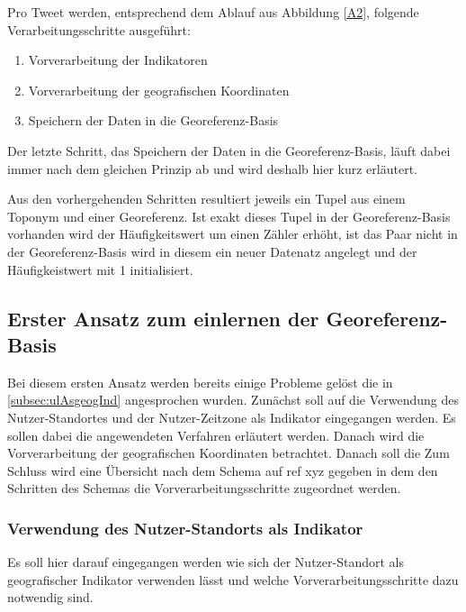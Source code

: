 					Pro Tweet werden, entsprechend dem Ablauf aus Abbildung \ref{A2}, folgende Verarbeitungsschritte ausgeführt:

					\begin{enumerate}
						\item Vorverarbeitung der Indikatoren
						\item Vorverarbeitung der geografischen Koordinaten
						\item Speichern der Daten in die Georeferenz-Basis
					\end{enumerate}

					Der letzte Schritt, das Speichern der Daten in die Georeferenz-Basis, läuft dabei immer nach dem gleichen Prinzip ab und wird deshalb hier kurz erläutert.
					
					Aus den vorhergehenden Schritten resultiert jeweils ein Tupel aus einem Toponym und einer Georeferenz. 
					Ist exakt dieses Tupel in der Georeferenz-Basis vorhanden wird der Häufigkeitswert um einen Zähler erhöht, ist das Paar nicht in der Georeferenz-Basis wird in diesem ein neuer Datenatz angelegt und der Häufigkeistwert mit 1 initialisiert.

				\subsection{Erster Ansatz zum einlernen der Georeferenz-Basis}

					Bei diesem ersten Ansatz werden bereits einige Probleme gelöst die in \ref{subsec:ulAsgeogInd} angesprochen wurden. 
					Zunächst soll auf die Verwendung des Nutzer-Standortes und der Nutzer-Zeitzone als Indikator eingegangen werden.
					Es sollen dabei die angewendeten Verfahren erläutert werden.
					Danach wird die Vorverarbeitung der geografischen Koordinaten betrachtet.
					Danach soll die 
					Zum Schluss wird eine Übersicht nach dem Schema auf ref xyz gegeben in dem den Schritten des Schemas die Vorverarbeitungsschritte zugeordnet werden. 



					\subsubsection{Verwendung des Nutzer-Standorts als Indikator}

					Es soll hier darauf eingegangen werden wie sich der Nutzer-Standort als geografischer Indikator verwenden lässt und welche Vorverarbeitungsschritte dazu notwendig sind. 

